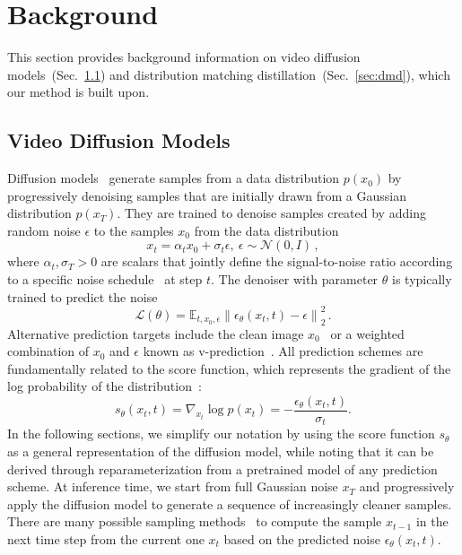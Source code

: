 \section{Background}
\label{sec:background}
This section provides background information on video diffusion models~(Sec.~\ref{sec:video_diffusion}) and distribution matching distillation~(Sec.~\ref{sec:dmd}), which our method is built upon.

\subsection{Video Diffusion Models}
\label{sec:video_diffusion}
Diffusion models~\cite{sohl2015deep,ho2020denoising} generate samples from a data distribution $p(x_{0})$ by progressively denoising samples that are initially drawn from a Gaussian distribution $p(x_{T})$. 
They are trained to denoise samples created by adding random noise $\epsilon$ to the samples $x_0$ from the data distribution
\begin{equation}
    x_t = \alpha_t x_0 + \sigma_t\epsilon,\ \epsilon \sim \mathcal{N}(0, I)\,,
    \label{eq:diffusion_noise}
\end{equation}
where $\alpha_t, \sigma_T>0$ are scalars that jointly define the signal-to-noise ratio according to a specific noise schedule~\cite{karras2022elucidating,kingma2021variational,song2020score} at step $t$. 
The denoiser with parameter $\theta$ is typically trained to predict the noise~\cite{ho2020denoising}
\begin{equation}
    \mathcal{L}(\theta) = \mathbb{E}_{t, x_0, \epsilon}\left\|\epsilon_{\theta}(x_t, t) - \epsilon\right\|_2^2\,.
    \label{eq:denoising_loss}
\end{equation}
Alternative prediction targets include the clean image $x_0$~\cite{salimans2022progressive,karras2022elucidating} or a weighted combination of $x_0$ and $\epsilon$ known as v-prediction~\cite{salimans2022progressive}.
All prediction schemes are fundamentally related to the score function, which represents the gradient of the log probability of the distribution~\cite{song2020score,kingma2021variational}: \begin{equation} \label{eq
} s_\theta(x_t, t) = \nabla_{x_t} \log p(x_t) = - \frac{\epsilon_\theta(x_t, t)}{\sigma_t}. \end{equation} In the following sections, we simplify our notation by using the score function $s_\theta$ as a general representation of the diffusion model, while noting that it can be derived through reparameterization from a pretrained model of any prediction scheme.
At inference time, we start from full Gaussian noise $x_T$ and progressively apply the diffusion model to generate a sequence of increasingly cleaner samples. There are many possible sampling methods~\cite{song2020denoising,lu2022dpm,zhangfast,karras2022elucidating} to compute the sample $x_{t-1}$ in the next time step from the current one $x_t$ based on the predicted noise $\epsilon_{\theta}(x_t, t)$.

